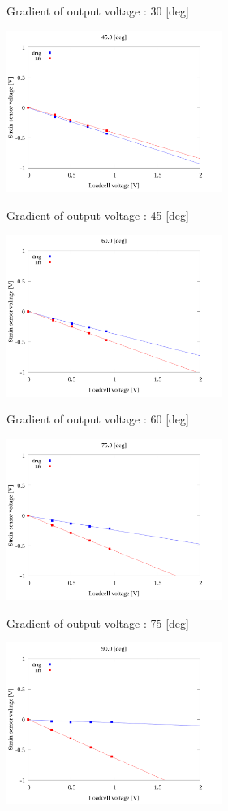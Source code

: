\begin{multicols}{2}
\begin{figure_here}
\begin{center}
            \caption{Gradient of output voltage : 30 [deg]}
            \includegraphics[width=70mm]{../../02_workspace/result/2-1/plot/04/04_linear_450.png}
            \caption{Gradient of output voltage : 45 [deg]}
            \includegraphics[width=70mm]{../../02_workspace/result/2-1/plot/04/04_linear_600.png}
            \caption{Gradient of output voltage : 60 [deg]}
            \includegraphics[width=70mm]{../../02_workspace/result/2-1/plot/04/04_linear_750.png}
            \caption{Gradient of output voltage : 75 [deg]}
            \includegraphics[width=70mm]{../../02_workspace/result/2-1/plot/04/04_linear_900.png}

\end{center}
\end{figure_here}
\end{multicols}
